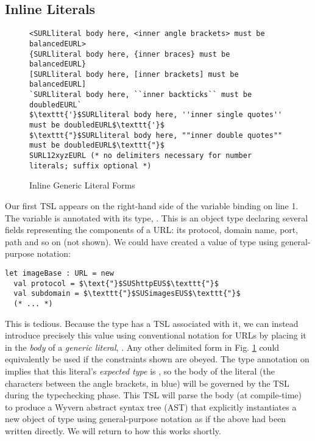 \subsection{Inline Literals}
\begin{figure}[t]
\begin{lstlisting}[numbers=none]
<SURLliteral body here, <inner angle brackets> must be balancedEURL>
{SURLliteral body here, {inner braces} must be balancedEURL}
[SURLliteral body here, [inner brackets] must be balancedEURL]
`SURLliteral body here, ``inner backticks`` must be doubledEURL`
$\texttt{'}$SURLliteral body here, ''inner single quotes'' must be doubledEURL$\texttt{'}$
$\texttt{"}$SURLliteral body here, ""inner double quotes"" must be doubledEURL$\texttt{"}$
SURL12xyzEURL (* no delimiters necessary for number literals; suffix optional *)
\end{lstlisting}
\vspace{-8px}
\caption{Inline Generic Literal Forms}
\label{f-delims}
\end{figure}
Our first TSL appears on the right-hand side of the variable binding on line 1. The variable  is annotated with its type, . This is an {object type} declaring several fields representing the components of a URL: its protocol, domain name, port, path and so on (not shown). We could have created a value of type  using general-purpose notation:
\begin{lstlisting}
let imageBase : URL = new
  val protocol = $\text{"}$SUShttpEUS$\texttt{"}$
  val subdomain = $\texttt{"}$SUSimagesEUS$\texttt{"}$
  (* ... *)
\end{lstlisting}
This is tedious. Because the  type has a TSL associated with it, we can instead introduce precisely this value using conventional notation for URLs by placing it in the \emph{body} of a \emph{generic literal}, . Any other delimited form in Fig. \ref{f-delims} could equivalently be used if the constraints shown are obeyed. The type annotation on  implies that this literal's \emph{expected type} is , so the {body} of the literal (the characters between the angle brackets, in blue) will be governed by the  TSL during the typechecking phase. This TSL will parse the body ({at compile-time}) to produce a Wyvern abstract syntax tree (AST) that explicitly instantiates a new object of type  using general-purpose notation as if the above had been written directly. We will return to how this works shortly. 

